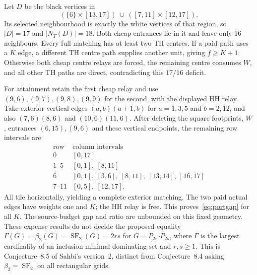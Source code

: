 \documentclass[11pt]{article}
\newcommand{\SF}{\operatorname{SF}_2}
\newcommand{\diss}{\beta_2}
\begin{document}
Let $D$ be the black vertices in
\[
 (\{6\}\times[13,17])\ \cup\ ([7,11]\times[12,17]).
\]
Its selected neighbourhood is exactly the white vertices of that region,
so $|D|=17$ and $|N_T(D)|=18$. Both cheap entrances lie in it and leave
only 16 neighbours. Every full matching has at least two TH centres.
If a paid path uses a $K$ edge, a different TH centre path supplies
another unit, giving $f\ge K+1$. Otherwise both cheap centre relays
are forced, the remaining centre consumes $W$, and all other TH paths
are direct, contradicting this $17/16$ deficit.

For attainment retain the first cheap relay and use
$(9,6),(9,7),(9,8),(9,9)$ for the second, with the displayed HH relay.
Take exterior vertical edges $(a,b)(a+1,b)$ for $a=1,3,5$ and $b=2,12$,
and also $(7,6)(8,6)$ and $(10,6)(11,6)$. After deleting the square
footprints, $W$, entrances $(6,15),(9,6)$ and these vertical endpoints,
the remaining row intervals are
\[
\begin{array}{c|l}
\text{row}&\text{column intervals}\\\hline
0 &[0,17]\\
1\text{--}5 &[0,1],\ [8,11]\\
6 &[0,1],\ [3,6],\ [8,11],\ [13,14],\ [16,17]\\
7\text{--}11 &[0,5],\ [12,17].
\end{array}
\]
All tile horizontally, yielding a complete exterior matching. The two
paid actual edges have weights one and $K$; the HH relay is free.
This proves~\eqref{eq:portgap} for all $K$. The source-budget gap and
ratio are unbounded on this fixed geometry. These expense results do not
decide the proposed equality $\Gamma(G)=\diss(G)=\SF(G)=2rs$ for
$G=P_{2r}\square P_{2s}$, where $\Gamma$ is the largest cardinality of
an inclusion-minimal dominating set and $r,s\ge1$. This is Conjecture~8.5
of Sahbi's version~2, distinct from Conjecture~8.4 asking $\diss=\SF$
on all rectangular grids.



\end{document}
